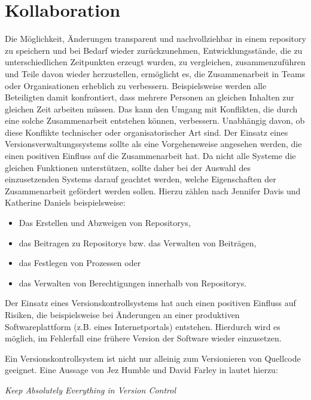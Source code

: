 \section{Kollaboration}\label{sec:collaboration}
Die Möglichkeit, Änderungen transparent und nachvollziehbar in einem
\gls{repository} zu speichern und bei Bedarf wieder zurückzunehmen,
Entwicklungsstände, die zu unterschiedlichen Zeitpunkten erzeugt wurden, zu
vergleichen, zusammenzuführen und Teile davon wieder herzustellen, ermöglicht
es, die Zusammenarbeit in Teams oder Organisationen erheblich zu verbessern.
Beispielsweise werden alle Beteiligten damit konfrontiert, dass mehrere
Personen an gleichen Inhalten zur gleichen Zeit arbeiten müssen. Das kann den
Umgang mit Konflikten, die durch eine solche Zusammenarbeit entstehen können,
verbessern. Unabhängig davon, ob diese Konflikte technischer oder
organisatorischer Art sind. Der Einsatz eines Versionsverwaltungssystems sollte
als eine Vorgehensweise angesehen werden, die einen positiven Einfluss auf die
Zusammenarbeit hat. Da nicht alle Systeme die gleichen Funktionen unterstützen,
sollte daher bei der Auswahl des einzusetzenden Systems darauf geachtet werden,
welche Eigenschaften der Zusammenarbeit gefördert werden sollen. Hierzu zählen
nach Jennifer Davis und Katherine Daniels \cite[S.~178]{effdo} beispielsweise:

\begin{itemize}
\item Das Erstellen und Abzweigen von Repositorys,
\item das Beitragen zu Repositorys bzw. das Verwalten von Beiträgen,
\item das Festlegen von Prozessen oder
\item das Verwalten von Berechtigungen innerhalb von Repositorys.
\end{itemize}

Der Einsatz eines Versionskontrollsystems hat auch einen positiven Einfluss auf
Risiken, die beispielsweise bei Änderungen an einer produktiven
Softwareplattform (z.B.  eines Internetportals) entstehen. Hierdurch wird es
möglich, im Fehlerfall eine frühere Version der Software wieder einzusetzen.
 \cite[S.~178]{effdo}

Ein Versionskontrollsystem ist nicht nur alleinig zum Versionieren von Quellcode geeignet.
Eine Aussage von Jez Humble und David Farley in \cite[S.~33]{cd} lautet hierzu:

\begin{center}
\textit{\glqq{}Keep Absolutely Everything in Version Control\grqq{}}
\end{center}

